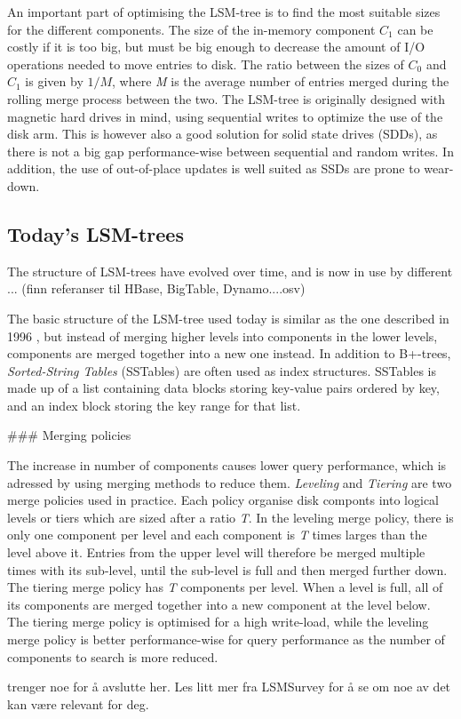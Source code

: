 An important part of optimising the LSM-tree is to find the most suitable sizes for the different components. The size of the in-memory component $C_1$ can be costly if it is too big, but must be big enough to decrease the amount of I/O operations needed to move entries to disk. The ratio between the sizes of $C_0$ and $C_1$ is given by $1/M$, where \emph{M} is the average number of entries merged during the rolling merge process between the two. The LSM-tree is originally designed with magnetic hard drives in mind, using sequential writes to optimize the use of the disk arm. This is however also a good solution for solid state drives (SDDs), as there is not a big gap performance-wise between sequential and random writes. In addition, the use of out-of-place updates is well suited as SSDs are prone to wear-down\cite{LSMSDD}.

\subsection{Today's LSM-trees}
The structure of LSM-trees have evolved over time, and is now in use by different ... (finn referanser til HBase, BigTable, Dynamo....osv) 

The basic structure of the LSM-tree used today is similar as the one described in 1996 \cite{LSMTree}, but instead of merging higher levels into components in the lower levels, components are merged together into a new one instead\cite{LSMSurvey}. In addition to B+-trees, \emph{Sorted-String Tables} (SSTables) are often used as index structures. SSTables is made up of a list containing data blocks storing key-value pairs ordered by key, and an index block storing the key range for that list. 

### Merging policies

The increase in number of components causes lower query performance, which is adressed by using merging methods to reduce them. \emph{Leveling} and \emph{Tiering} are two merge policies used in practice. Each policy organise disk componts into logical levels or tiers which are sized after a ratio \emph{T}. In the leveling merge policy, there is only one component per level and each component is \emph{T} times larges than the level above it. Entries from the upper level will therefore be merged multiple times with its sub-level, until the sub-level is full and then merged further down. The tiering merge policy has \emph{T} components per level. When a level is full, all of its components are merged together into a new component at the level below. The tiering merge policy is optimised for a high write-load, while the leveling merge policy is better performance-wise for query performance as the number of components to search is more reduced\cite{LSMSurvey}. 

trenger noe for å avslutte her. Les litt mer fra LSMSurvey for å se om noe av det kan være relevant for deg.